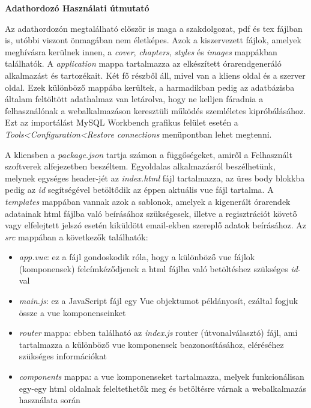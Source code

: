 \pagestyle{empty}

\noindent \textbf{\Large Adathordozó Használati útmutató}

\vskip 1cm

Az adathordozón megtalálható először is maga a szakdolgozat, pdf és tex fájlban is, utóbbi viszont önmagában nem életképes. Azok a kiszervezett fájlok, amelyek meghívásra kerülnek innen, a \textit{cover}, \textit{chapters}, \textit{styles} és \textit{images} mappákban találhatók. A \textit{application} mappa tartalmazza az elkészített órarendgeneráló alkalmazást és tartozékait. Két fő részből áll, mivel van a kliens oldal és a szerver oldal. Ezek különböző mappába kerültek, a harmadikban pedig az adatbázisba általam feltöltött adathalmaz van letárolva, hogy ne kelljen fáradnia a felhasználónak a webalkalmazáson keresztüli működés szemléletes kipróbálásához. Ezt az importálást MySQL Workbench grafikus felület esetén a \textit{Tools<Configuration<Restore connections} menüpontban lehet megtenni.

A kliensben a \textit{package.json} tartja számon a függőségeket, amiről a Felhasznált szoftverek alfejezetben beszéltem. Egyoldalas alkalmazásról beszélhetünk, melynek egységes header-jét az \textit{index.html} fájl tartalmazza, az üres body blokkba pedig az \textit{id} segítségével betöltődik az éppen aktuális vue fájl tartalma. A \textit{templates} mappában vannak azok a sablonok, amelyek a kigenerált órarendek adatainak html fájlba való beírásához szükségesek, illetve a regisztrációt követő vagy elfelejtett jelszó esetén kiküldött email-ekben szereplő adatok beírásához. Az \textit{src} mappában a következők találhatók:

\begin{itemize} 
	\item \textit{app.vue}: ez a fájl gondoskodik róla, hogy a különböző vue fájlok (komponensek) felcímkéződjenek a html fájlba való betöltéshez szükséges \textit{id}-val
	\item \textit{main.js}: ez a JavaScript fájl egy Vue objektumot példányosít, ezáltal fogjuk össze a vue komponenseinket
	\item \textit{router} mappa: ebben található az \textit{index.js} router (útvonalválasztó) fájl, ami tartalmazza a különböző vue komponensek beazonosításához, eléréséhez szükséges információkat
	\item \textit{components} mappa: a vue komponenseket tartalmazza, melyek funkcionálisan egy-egy html oldalnak feleltethetők meg és betöltésre várnak a webalkalmazás használata során
\end{itemize}

